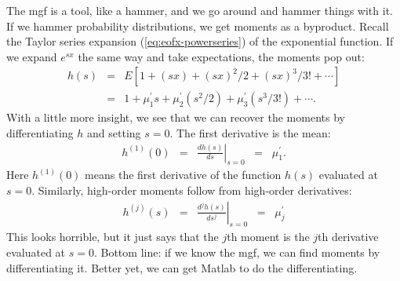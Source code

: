 \documentclass[11pt]{article}
\begin{document}
The mgf is a tool, like a hammer, and we go around and hammer things with it.
If we hammer probability distributions, we get moments as a byproduct.
Recall the Taylor series expansion (\ref{eq:eofx-powerseries}) of the exponential function.
If we expand $e^{sx}$ the same way and take expectations,
the moments pop out:
\begin{eqnarray*}
    h(s) &=& E \left[ 1 + (sx) + (sx)^2/2 + (sx)^3/3! + \cdots \right] \\
            &=&  1 + \mu_1^\prime s + \mu_2^\prime (s^2/2)  + \mu_3^\prime (s^3/3!)  + \cdots .
\end{eqnarray*}
With a little more insight, we see that we can recover the moments by differentiating
$h$ and setting $s=0$.
The first derivative is the mean:
\begin{eqnarray*}
    h^{(1)} (0)  &=& \left. \frac{ d h(s)}{d s} \right|_{s=0}
            \;\;=\;\;  \mu_1^\prime .
\end{eqnarray*}
Here $h^{(1)}(0)$ means the first derivative of the function $h(s)$ evaluated at
$s=0$.
Similarly, high-order moments follow from high-order derivatives:
\begin{eqnarray*}
    h^{(j)} (s)  &=& \left. \frac{d^j h(s)}{d s^j} \right|_{s=0}
            \;\;=\;\;  \mu_j^\prime
\end{eqnarray*}
This looks horrible, but it just says that the $j$th moment is the $j$th derivative
evaluated at $s=0$.
Bottom line:  if we know the mgf, we can find moments by differentiating it.
Better yet, we can get Matlab to do the differentiating.
\end{document}
